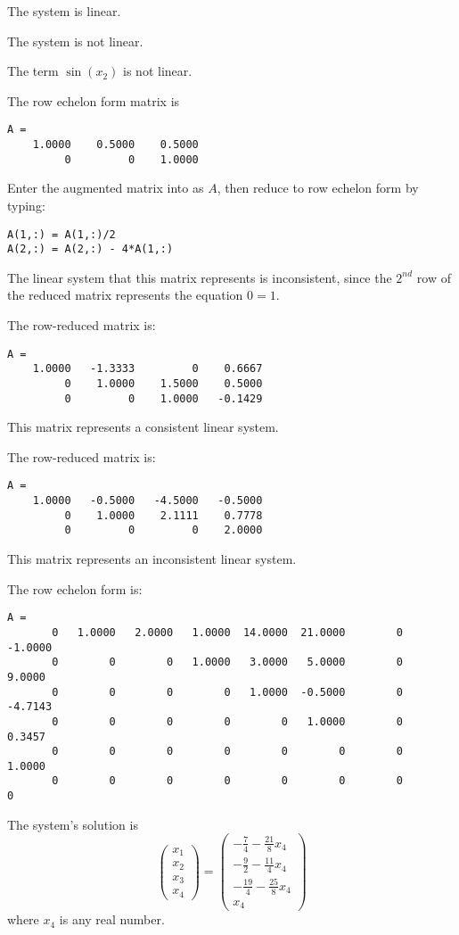  \ans The system is linear.

 \ans The system is not linear.

\soln The term $\sin(x_2)$ is not linear.


 \ans The row echelon form matrix is
\begin{verbatim}
A = 
    1.0000    0.5000    0.5000
         0         0    1.0000
\end{verbatim}
\soln Enter the augmented matrix into \Matlab as $A$, then reduce to
row echelon form by typing:
\begin{verbatim}
A(1,:) = A(1,:)/2
A(2,:) = A(2,:) - 4*A(1,:)
\end{verbatim}
The linear system that this matrix represents is inconsistent, since
the $2^{nd}$ row of the reduced matrix represents the equation $0 = 1$.

 The row-reduced matrix is:
\begin{verbatim}
A =
    1.0000   -1.3333         0    0.6667
         0    1.0000    1.5000    0.5000
         0         0    1.0000   -0.1429
\end{verbatim}
This matrix represents a consistent linear system.

 The row-reduced matrix is:
\begin{verbatim}
A =
    1.0000   -0.5000   -4.5000   -0.5000
         0    1.0000    2.1111    0.7778
         0         0         0    2.0000
\end{verbatim}
This matrix represents an inconsistent linear system.

\newpage
{} The row echelon form is:
\begin{verbatim}
A = 
       0   1.0000   2.0000   1.0000  14.0000  21.0000        0  -1.0000
       0        0        0   1.0000   3.0000   5.0000        0   9.0000
       0        0        0        0   1.0000  -0.5000        0  -4.7143
       0        0        0        0        0   1.0000        0   0.3457
       0        0        0        0        0        0        0   1.0000
       0        0        0        0        0        0        0        0
\end{verbatim}


\ans The system's solution is
\[
\left(\begin{array}{c} x_1 \\ x_2 \\ x_3 \\ x_4\end{array}\right) =
\left(\begin{array}{c} -\frac{7}{4} - \frac{21}{8}x_4 \\ -\frac{9}{2} -
\frac{11}{4}x_4 \\ -\frac{19}{4} - \frac{25}{8}x_4 \\ x_4\end{array}\right)
\]
where $x_4$ is any real number.

